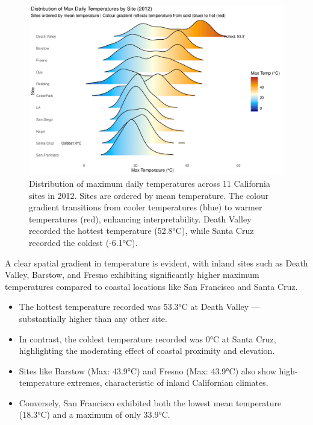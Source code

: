 \documentclass[
  11pt,
]{article}
\begin{document}
\begin{figure}[H]

{\centering \includegraphics{project_files/figure-pdf/ca_temp_ridgeline-1.pdf}

}

\caption{Distribution of maximum daily temperatures across 11 California
sites in 2012. Sites are ordered by mean temperature. The colour
gradient transitions from cooler temperatures (blue) to warmer
temperatures (red), enhancing interpretability. Death Valley recorded
the hottest temperature (52.8°C), while Santa Cruz recorded the coldest
(-6.1°C).}

\end{figure}%

A clear spatial gradient in temperature is evident, with inland sites
such as Death Valley, Barstow, and Fresno exhibiting significantly
higher maximum temperatures compared to coastal locations like San
Francisco and Santa Cruz.

\begin{itemize}
\item
  The hottest temperature recorded was 53.3°C at Death Valley ---
  substantially higher than any other site.
\item
  In contrast, the coldest temperature recorded was 0°C at Santa Cruz,
  highlighting the moderating effect of coastal proximity and elevation.
\item
  Sites like Barstow (Max: 43.9°C) and Fresno (Max: 43.9°C) also show
  high-temperature extremes, characteristic of inland Californian
  climates.
\item
  Conversely, San Francisco exhibited both the lowest mean temperature
  (18.3°C) and a maximum of only 33.9°C.
\end{itemize}
\end{document}
